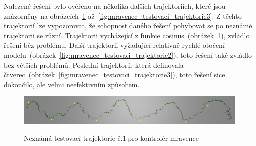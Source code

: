 Nalezené řešení bylo ověřeno na několika dalších trajektoriích, které jsou znázorněny na obrázcích~\ref{fig:mravenec_testovaci_trajektorie1} až~\ref{fig:mravenec_testovaci_trajektorie3}.
Z těchto trajektorií lze vypozorovat, že schopnost daného řešení pohybovat se po neznámé trajektorii se různí.
Trajektorii vycházející z funkce cosinus~(obrázek~\ref{fig:mravenec_testovaci_trajektorie1}), zvládlo řešení běz problému.
Další trajektorii vyžadující relativně rychlé otočení modelu~(obrázek~\ref{fig:mravenec_testovaci_trajektorie2}), toto řešení také zvládlo bez větších problémů.
Poslední trajektorii, která definovala čtverec~(obrázek~\ref{fig:mravenec_testovaci_trajektorie3}), toto řešení sice dokončilo, ale velmi neefektivním způsobem.


\begin{figure}[h]
    \centering
    {\includegraphics[width=\linewidth]{obrazky/mravenec_testovaci_trajektorie1.png}}
    \caption{
    Neznámá testovací trajektorie č.1 pro kontrolér mravence
    }
    \label{fig:mravenec_testovaci_trajektorie1}
\end{figure}

